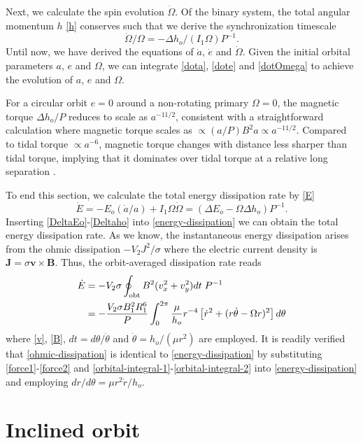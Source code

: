 \documentclass[twocolumn,linenumbers]{aastex631}
\begin{document}
Next, we calculate the spin evolution $\dot\Omega$. Of the binary system, the total angular momentum $h$ \eqref{h} conserves such that we derive the synchronization timescale
\begin{equation}\label{dotOmega}
\dot\Omega/\Omega=-\Delta h_o/(I_1\Omega)P^{-1}.
\end{equation}
Until now, we have derived the equations of $\dot a$, $\dot e$ and $\dot\Omega$. Given the initial orbital parameters $a$, $e$ and $\Omega$, we can integrate \eqref{dota}, \eqref{dote} and \eqref{dotOmega} to achieve the evolution of $a$, $e$ and $\Omega$.

For a circular orbit $e=0$ around a non-rotating primary $\Omega=0$, the magnetic torque $\Delta h_o/P$ reduces to scale as $a^{-11/2}$, consistent with a straightforward calculation where magnetic torque scales as $\propto (a/P)B^2a\propto a^{-11/2}$. Compared to tidal torque $\propto a^{-6}$, magnetic torque changes with distance less sharper than tidal torque, implying that it dominates over tidal torque at a relative long separation \citep{wei2024}.

To end this section, we calculate the total energy dissipation rate by \eqref{E}
\begin{equation}\label{energy-dissipation}
\dot E=-E_o(\dot a/a)+I_1\Omega\dot\Omega=\left(\Delta E_o-\Omega\Delta h_o\right)P^{-1}.
\end{equation}
Inserting \eqref{DeltaEo}-\eqref{Deltaho} into \eqref{energy-dissipation} we can obtain the total energy dissipation rate. As we know, the instantaneous energy dissipation arises from the ohmic dissipation $-V_2J^2/\sigma$ where the electric current density is $\bm J=\sigma\bm v\times\bm B$. Thus, the orbit-averaged dissipation rate reads
\begin{align}\label{ohmic-dissipation}
\dot E & =-V_2\sigma\oint_{\rm obt}B^2(v_x^2+v_y^2)dt\;P^{-1}  \nonumber \\
& =-\frac{V_2\sigma B_1^2R_1^6}{P}\int_0^{2\pi}\frac{\mu}{h_o}r^{-4}\left[\dot r^2+(r\dot\theta-\Omega r)^2\right]d\theta
\end{align}
where \eqref{v}, \eqref{B}, $dt=d\theta/\dot\theta$ and $\dot\theta=h_o/(\mu r^2)$ are employed. It is readily verified that \eqref{ohmic-dissipation} is identical to \eqref{energy-dissipation} by substituting \eqref{force1}-\eqref{force2} and \eqref{orbital-integral-1}-\eqref{orbital-integral-2} into \eqref{energy-dissipation} and employing $dr/d\theta=\mu r^2\dot r/h_o$.

\section{Inclined orbit} \label{inclined}
\end{document}
